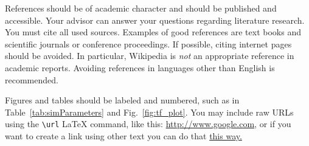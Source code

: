 \documentclass[journal, a4paper]{IEEEtran}
\begin{document}
	References should be of academic character and should be published and accessible. Your advisor can answer your questions regarding literature research. You must cite all used sources.	Examples of good references are text books and scientific journals or conference proceedings.	If possible, citing internet pages should be avoided. In particular, Wikipedia is \emph{not} an appropriate reference in academic reports. Avoiding references in languages other than English is recommended.


	Figures and tables should be labeled and numbered, such as in Table~\ref{tab:simParameters} and Fig.~\ref{fig:tf_plot}. You may include raw URLs using the \texttt{\textbackslash url} \LaTeX{} command, like this: \url{http://www.google.com}, or if you want to create a link using other text you can do that \href{https://www.google.com}{this way.}

\end{document}
